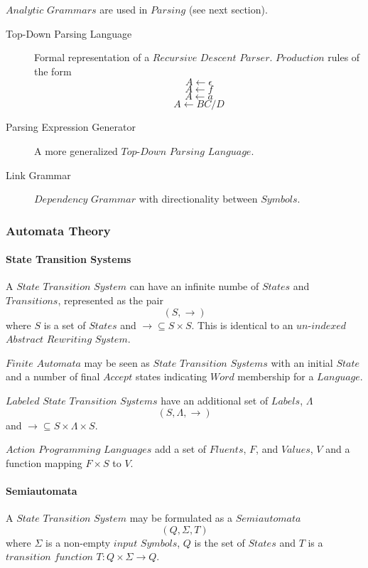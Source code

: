 \documentclass{article}
\begin{document}
    $Analytic$ $Grammars$ are used in $Parsing$ (see next section).

    \begin{description}
    \item[Top-Down Parsing Language] Formal representation of a
      $Recursive$ $Descent$ $Parser$. $Production$ rules of the form
    \[
        A \leftarrow \epsilon
    \]\[
        A \leftarrow f
    \]\[
        A \leftarrow a
    \]\[
        A \leftarrow BC/D
    \]
    \item[Parsing Expression Generator]
    A more generalized $Top$-$Down$ $Parsing$ $Language$.
    \item[Link Grammar]
    $Dependency$ $Grammar$ with directionality between $Symbols$.
    \end{description}

\subsubsection{Automata Theory}

    \paragraph{State Transition Systems}
    A $State$ $Transition$ $System$ can have an infinite numbe of
    $States$ and $Transitions$, represented as the pair
    \[
        (S,\rightarrow)
    \]
    where $S$ is a set of $States$ and $\rightarrow \subseteq S \times
    S$. This is identical to an $un$-$indexed$ $Abstract$ $Rewriting$
    $System$.

    $Finite$ $Automata$ may be seen as $State$ $Transition$ $Systems$
    with an initial $State$ and a number of final $Accept$ states
    indicating $Word$ membership for a $Language$.

    $Labeled$ $State$ $Transition$ $Systems$ have an additional set of
    $Labels$, $\Lambda$
    \[(S,\Lambda,\rightarrow)\]
    and $\rightarrow \subseteq S \times \Lambda \times S$.

    $Action$ $Programming$ $Languages$ add a set of $Fluents$, $F$,
    and $Values$, $V$ and a function mapping $F \times S$ to $V$.

    \paragraph{Semiautomata}
    A $State$ $Transition$ $System$ may be formulated as a $Semiautomata$
    \[
        (Q,\Sigma,T)
    \]
    where $\Sigma$ is a non-empty $input$ $Symbols$, $Q$ is the set of
    $States$ and $T$ is a $transition$ $function$ $T:Q \times \Sigma
    \rightarrow Q$.
\end{document}
